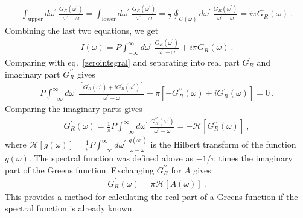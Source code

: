\begin{equation}\begin{aligned}
	\int_\text{upper} d\omega^\prime~\frac{G_R(\omega^\prime)}{\omega^\prime - \omega} = \int_\text{lower} d\omega^\prime~\frac{G_R(\omega^\prime)}{\omega^\prime - \omega} = \frac{1}{2}\oint_{C(\omega)} d\omega^\prime~\frac{G_R(\omega^\prime)}{\omega^\prime - \omega} = i\pi G_R(\omega)~.
\end{aligned}\end{equation}
Combining the last two equations, we get
\begin{equation}\begin{aligned}
	I(\omega) = P\int_{-\infty}^{\infty}d\omega^\prime~\frac{G_R(\omega^\prime)}{\omega^\prime - \omega} + i\pi G_R(\omega)~.
\end{aligned}\end{equation}
Comparing with eq.~\ref{zerointegral} and separating into real part \(G_R^\prime\) and imaginary part \(G_R^{\prime\prime}\) gives
\begin{equation}\begin{aligned}
	P\int_{-\infty}^{\infty}d\omega^\prime~\frac{\left[G_R^\prime(\omega^\prime) + i G_R^{\prime\prime}(\omega^\prime)\right]}{\omega^\prime - \omega} + \pi\left[-G_R^{\prime\prime}(\omega) + i G_R^\prime(\omega) \right]= 0~.
\end{aligned}\end{equation}
Comparing the imaginary parts gives
\begin{equation}\begin{aligned}
	G_R^\prime(\omega) = \frac{1}{\pi}P\int_{-\infty}^{\infty}d\omega^\prime~\frac{G_R^{\prime\prime}(\omega^\prime)}{\omega^\prime - \omega} = - \mathcal{H}\left[G_R^{\prime\prime}(\omega)\right] ~,
\end{aligned}\end{equation}
where \(\mathcal{H}\left[g(\omega)\right]=\frac{1}{\pi}P\int_{-\infty}^{\infty}d\omega^\prime~\frac{g(\omega^\prime)}{\omega - \omega^\prime}\) is the Hilbert transform of the function \(g(\omega)\). The spectral function was defined above as \(-1/\pi\) times the imaginary part of the Greens function. Exchanging \(G_R^{\prime\prime}\) for \(A\) gives
\begin{equation}\begin{aligned}
	G_R^\prime(\omega) = \pi \mathcal{H}\left[A(\omega)\right]~.
\end{aligned}\end{equation}
This provides a method for calculating the real part of a Greens function if the spectral function is already known.
